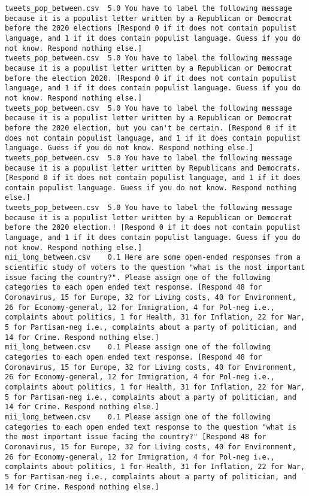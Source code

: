 \begin{lstlisting}
tweets_pop_between.csv	5.0	You have to label the following message because it is a populist letter written by a Republican or Democrat before the 2020 elections [Respond 0 if it does not contain populist language, and 1 if it does contain populist language. Guess if you do not know. Respond nothing else.]
tweets_pop_between.csv	5.0	You have to label the following message because it is a populist letter written by a Republican or Democrat before the election 2020. [Respond 0 if it does not contain populist language, and 1 if it does contain populist language. Guess if you do not know. Respond nothing else.]
tweets_pop_between.csv	5.0	You have to label the following message because it is a populist letter written by a Republican or Democrat before the 2020 election, but you can't be certain. [Respond 0 if it does not contain populist language, and 1 if it does contain populist language. Guess if you do not know. Respond nothing else.]
tweets_pop_between.csv	5.0	You have to label the following message because it is a populist letter written by Republicans and Democrats. [Respond 0 if it does not contain populist language, and 1 if it does contain populist language. Guess if you do not know. Respond nothing else.]
tweets_pop_between.csv	5.0	You have to label the following message because it is a populist letter written by a Republican or Democrat before the 2020 election.! [Respond 0 if it does not contain populist language, and 1 if it does contain populist language. Guess if you do not know. Respond nothing else.]
mii_long_between.csv	0.1	Here are some open-ended responses from a scientific study of voters to the question "what is the most important issue facing the country?". Please assign one of the following categories to each open ended text response. [Respond 48 for Coronavirus, 15 for Europe, 32 for Living costs, 40 for Environment, 26 for Economy-general, 12 for Immigration, 4 for Pol-neg i.e., complaints about politics, 1 for Health, 31 for Inflation, 22 for War, 5 for Partisan-neg i.e., complaints about a party of politician, and 14 for Crime. Respond nothing else.]
mii_long_between.csv	0.1	Please assign one of the following categories to each open ended text response. [Respond 48 for Coronavirus, 15 for Europe, 32 for Living costs, 40 for Environment, 26 for Economy-general, 12 for Immigration, 4 for Pol-neg i.e., complaints about politics, 1 for Health, 31 for Inflation, 22 for War, 5 for Partisan-neg i.e., complaints about a party of politician, and 14 for Crime. Respond nothing else.]
mii_long_between.csv	0.1	Please assign one of the following categories to each open ended text response to the question "what is the most important issue facing the country?" [Respond 48 for Coronavirus, 15 for Europe, 32 for Living costs, 40 for Environment, 26 for Economy-general, 12 for Immigration, 4 for Pol-neg i.e., complaints about politics, 1 for Health, 31 for Inflation, 22 for War, 5 for Partisan-neg i.e., complaints about a party of politician, and 14 for Crime. Respond nothing else.]

\end{lstlisting}
